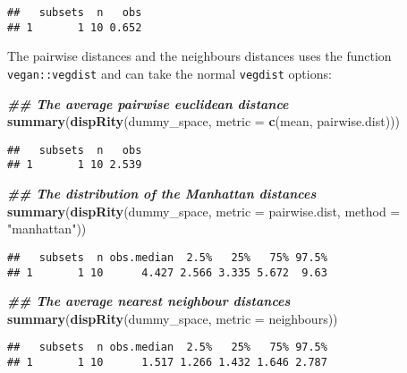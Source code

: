 \documentclass[
]{book}
\newenvironment{Shaded}{\begin{snugshade}}{\end{snugshade}}
\newcommand{\AttributeTok}[1]{\textcolor[rgb]{0.13,0.29,0.53}{#1}}
\newcommand{\DocumentationTok}[1]{\textcolor[rgb]{0.56,0.35,0.01}{\textbf{\textit{#1}}}}
\newcommand{\FunctionTok}[1]{\textcolor[rgb]{0.13,0.29,0.53}{\textbf{#1}}}
\newcommand{\NormalTok}[1]{#1}
\newcommand{\StringTok}[1]{\textcolor[rgb]{0.31,0.60,0.02}{#1}}
\begin{document}
\begin{verbatim}
##   subsets  n   obs
## 1       1 10 0.652
\end{verbatim}

The pairwise distances and the neighbours distances uses the function \texttt{vegan::vegdist} and can take the normal \texttt{vegdist} options:

\begin{Shaded}
\begin{Highlighting}[]
\DocumentationTok{\#\# The average pairwise euclidean distance}
\FunctionTok{summary}\NormalTok{(}\FunctionTok{dispRity}\NormalTok{(dummy\_space, }\AttributeTok{metric =} \FunctionTok{c}\NormalTok{(mean, pairwise.dist)))}
\end{Highlighting}
\end{Shaded}

\begin{verbatim}
##   subsets  n   obs
## 1       1 10 2.539
\end{verbatim}

\begin{Shaded}
\begin{Highlighting}[]
\DocumentationTok{\#\# The distribution of the Manhattan distances}
\FunctionTok{summary}\NormalTok{(}\FunctionTok{dispRity}\NormalTok{(dummy\_space, }\AttributeTok{metric =}\NormalTok{ pairwise.dist,}
                 \AttributeTok{method =} \StringTok{"manhattan"}\NormalTok{))}
\end{Highlighting}
\end{Shaded}

\begin{verbatim}
##   subsets  n obs.median  2.5%   25%   75% 97.5%
## 1       1 10      4.427 2.566 3.335 5.672  9.63
\end{verbatim}

\begin{Shaded}
\begin{Highlighting}[]
\DocumentationTok{\#\# The average nearest neighbour distances}
\FunctionTok{summary}\NormalTok{(}\FunctionTok{dispRity}\NormalTok{(dummy\_space, }\AttributeTok{metric =}\NormalTok{ neighbours))}
\end{Highlighting}
\end{Shaded}

\begin{verbatim}
##   subsets  n obs.median  2.5%   25%   75% 97.5%
## 1       1 10      1.517 1.266 1.432 1.646 2.787
\end{verbatim}
\end{document}
